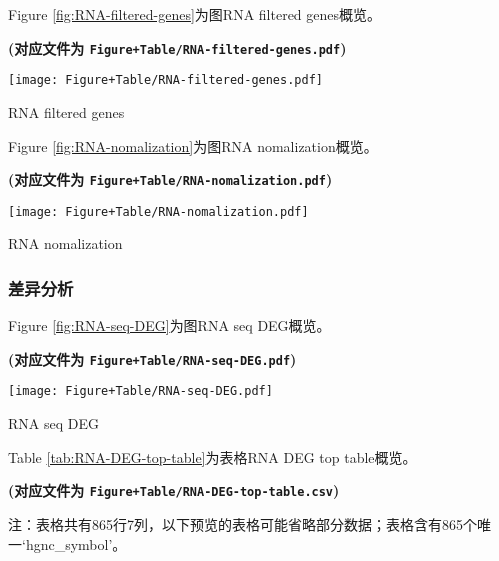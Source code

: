 \documentclass[
]{article}
\begin{document}
Figure \ref{fig:RNA-filtered-genes}为图RNA filtered genes概览。

\textbf{(对应文件为 \texttt{Figure+Table/RNA-filtered-genes.pdf})}

\def\@captype{figure}
\begin{center}
\texttt{[image: Figure+Table/RNA-filtered-genes.pdf]}
\caption{RNA filtered genes}\label{fig:RNA-filtered-genes}
\end{center}

Figure \ref{fig:RNA-nomalization}为图RNA nomalization概览。

\textbf{(对应文件为 \texttt{Figure+Table/RNA-nomalization.pdf})}

\def\@captype{figure}
\begin{center}
\texttt{[image: Figure+Table/RNA-nomalization.pdf]}
\caption{RNA nomalization}\label{fig:RNA-nomalization}
\end{center}

\hypertarget{ux5deeux5f02ux5206ux6790}{%
\subsubsection{差异分析}\label{ux5deeux5f02ux5206ux6790}}

Figure \ref{fig:RNA-seq-DEG}为图RNA seq DEG概览。

\textbf{(对应文件为 \texttt{Figure+Table/RNA-seq-DEG.pdf})}

\def\@captype{figure}
\begin{center}
\texttt{[image: Figure+Table/RNA-seq-DEG.pdf]}
\caption{RNA seq DEG}\label{fig:RNA-seq-DEG}
\end{center}

Table \ref{tab:RNA-DEG-top-table}为表格RNA DEG top table概览。

\textbf{(对应文件为 \texttt{Figure+Table/RNA-DEG-top-table.csv})}

\begin{center}\begin{tcolorbox}[colback=gray!10, colframe=gray!50, width=0.9\linewidth, arc=1mm, boxrule=0.5pt]注：表格共有865行7列，以下预览的表格可能省略部分数据；表格含有865个唯一`hgnc\_symbol'。
\end{tcolorbox}
\end{center}
\end{document}
